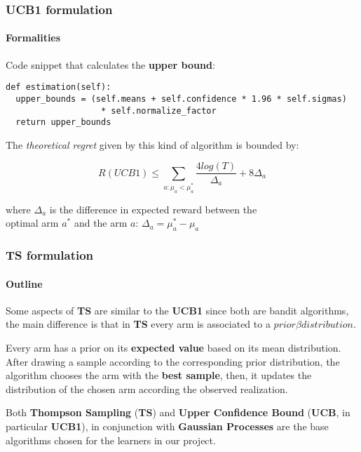 
\begin{frame}[fragile]

\frametitle{UCB1 formulation}
\framesubtitle{Formalities}

Code snippet that calculates the \textbf{upper bound}:

\begin{lstlisting}[style=Python, basicstyle=\tiny, numbers=none, framexrightmargin=-20pt]
def estimation(self):
  upper_bounds = (self.means + self.confidence * 1.96 * self.sigmas)
                   * self.normalize_factor
  return upper_bounds
\end{lstlisting}

The \textit{theoretical regret} given by this kind of algorithm is bounded by:

\begin{displaymath}
R(UCB1) \le \sum_{a:\mu_a < \mu_a^*} \frac{4log(T)}{\Delta_a} + 8\Delta_a
\end{displaymath}

where $\Delta_a$ is the difference in expected reward between the \\ optimal arm $a^*$ and the arm $a$: $\Delta_a = \mu_a^* - \mu_a$

\end{frame}


\begin{frame}

\frametitle{TS formulation}
\framesubtitle{Outline}

Some aspects of \textbf{TS} are similar to the \textbf{UCB1} since both are bandit algorithms, the main difference is that in \textbf{TS} every arm is associated to a $prior \beta distribution$.

Every arm has a prior on its \textbf{expected value} based on its mean distribution.
After drawing a sample according to the corresponding prior distribution, the algorithm chooses the arm with the \textbf{best sample}, then, it updates the distribution of the chosen arm according the observed realization.

Both \textbf{Thompson Sampling} (\textbf{TS}) and \textbf{Upper Confidence Bound} (\textbf{UCB}, in particular \textbf{UCB1}), in conjunction with \textbf{Gaussian Processes} are the base algorithms chosen for the learners in our project.

\end{frame}


